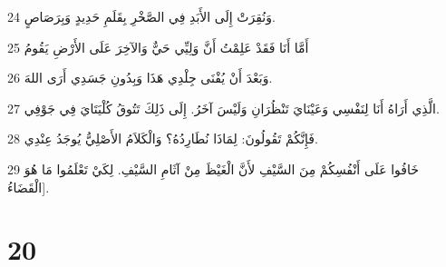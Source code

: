 \par 24 وَنُقِرَتْ إِلَى الأَبَدِ فِي الصَّخْرِ بِقَلَمِ حَدِيدٍ وَبِرَصَاصٍ.
\par 25 أَمَّا أَنَا فَقَدْ عَلِمْتُ أَنَّ وَلِيِّي حَيٌّ وَالآخِرَ عَلَى الأَرْضِ يَقُومُ
\par 26 وَبَعْدَ أَنْ يُفْنَى جِلْدِي هَذَا وَبِدُونِ جَسَدِي أَرَى اللهَ.
\par 27 الَّذِي أَرَاهُ أَنَا لِنَفْسِي وَعَيْنَايَ تَنْظُرَانِ وَلَيْسَ آخَرُ. إِلَى ذَلِكَ تَتُوقُ كُلْيَتَايَ فِي جَوْفِي.
\par 28 فَإِنَّكُمْ تَقُولُونَ: لِمَاذَا نُطَارِدُهُ؟ وَالْكَلاَمُ الأَصْلِيُّ يُوجَدُ عِنْدِي.
\par 29 خَافُوا عَلَى أَنْفُسِكُمْ مِنَ السَّيْفِ لأَنَّ الْغَيْظَ مِنْ آثَامِ السَّيْفِ. لِكَيْ تَعْلَمُوا مَا هُوَ الْقَضَاءُ].

\chapter{20}

